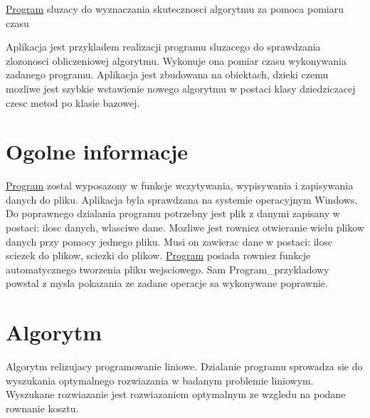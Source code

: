 \hyperlink{class_program}{Program} sluzacy do wyznaczania skutecznosci algorytmu za pomoca pomiaru czasu

Aplikacja jest przykladem realizacji programu sluzacego do sprawdzania zlozonosci obliczeniowej algorytmu. Wykonuje ona pomiar czasu wykonywania zadanego programu. Aplikacja jest zbudowana na obiektach, dzieki czemu mozliwe jest szybkie wstawienie nowego algorytmu w postaci klasy dziedziczacej czesc metod po klasie bazowej.\hypertarget{index_etykieta-ogolne-informacje}{}\section{Ogolne informacje}\label{index_etykieta-ogolne-informacje}
\hyperlink{class_program}{Program} zostal wyposazony w funkcje wczytywania, wypisywania i zapisywania danych do pliku. Aplikacja byla sprawdzana na systemie operacyjnym Windows. Do poprawnego dzialania programu potrzebny jest plik z danymi zapisany w postaci\+: ilosc danych, wlasciwe dane. Mozliwe jest rowniez otwieranie wielu plikow danych przy pomocy jednego pliku. Musi on zawierac dane w postaci\+: ilosc sciezek do plikow, sciezki do plikow. \hyperlink{class_program}{Program} posiada rowniez funkcje automatycznego tworzenia pliku wejsciowego. Sam Program\+\_\+przykladowy powstal z mysla pokazania ze zadane operacje sa wykonywane poprawnie.\hypertarget{index_etykieta-algortym}{}\section{Algorytm}\label{index_etykieta-algortym}
Algorytm relizujacy programowanie liniowe. Dzialanie programu sprowadza sie do wyszukania optymalnego rozwiazania w badanym problemie liniowym. Wyszukane rozwiazanie jest rozwiazaniem optymalnym ze wzgledu na podane rownanie kosztu. 